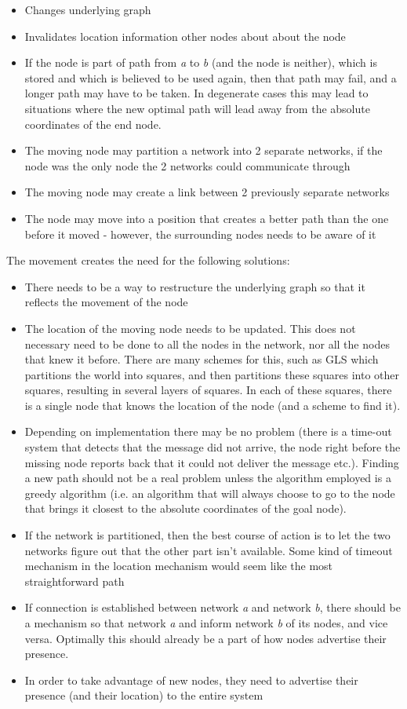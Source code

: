 \documentclass[letter, 12pt, english, draft]{article}
\begin{document}
\begin{itemize}
\item Changes underlying graph
\item Invalidates location information other nodes about about the node
\item If the node is part of path from \emph{a} to \emph{b} (and the node is neither), which is stored and which is believed to be used again, then that path may fail, and a longer path may have to be taken. In degenerate cases this may lead to situations where the new optimal path will lead away from the absolute coordinates of the end node.
\item The moving node may partition a network into 2 separate networks, if the node was the only node the 2 networks could communicate through
\item The moving node may create a link between 2 previously separate networks
\item The node may move into a position that creates a better path than the one before it moved - however, the surrounding nodes needs to be aware of it
\end{itemize}

The movement creates the need for the following solutions:
\begin{itemize}
\item There needs to be a way to restructure the underlying graph so that it reflects the movement of the node \cite{practical}
\item The location of the moving node needs to be updated. This does not necessary need to be done to all the nodes in the network, nor all the nodes that knew it before. There are many schemes for this, such as GLS \cite{scaleLocation} which partitions the world into squares, and then partitions these squares into other squares, resulting in several layers of squares. In each of these squares, there is a single node that knows the location of the node (and a scheme to find it).
\item Depending on implementation there may be no problem (there is a time-out system that detects that the message did not arrive, the node right before the missing node reports back that it could not deliver the message etc.). Finding a new path should not be a real problem unless the algorithm employed is a greedy algorithm (i.e. an algorithm that will always choose to go to the node that brings it closest to the absolute coordinates of the goal node).
\item If the network is partitioned, then the best course of action is to let the two networks figure out that the other part isn't available. Some kind of timeout mechanism in the location mechanism would seem like the most straightforward path
\item If connection is established between network \emph{a} and network \emph{b}, there should be a mechanism so that network \emph{a} and inform network \emph{b} of its nodes, and vice versa. Optimally this should already be a part of how nodes advertise their presence.
\item In order to take advantage of new nodes, they need to advertise their presence (and their location) to the entire system 
\end{itemize}
\end{document}
